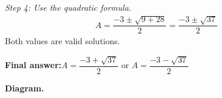\documentclass[11pt]{article}
\begin{document}
\textit{Step 4: Use the quadratic formula.}
\[\begin{gathered}
A = \dfrac{-3 \pm \sqrt{9 + 28}}{2} = \dfrac{-3 \pm \sqrt{37}}{2}
\end{gathered}\]
Both values are valid solutions.

\begin{answerbox}
\textbf{Final answer:}\quad \(\displaystyle A = \dfrac{-3 + \sqrt{37}}{2}\) or \(\displaystyle A = \dfrac{-3 - \sqrt{37}}{2}\)
\end{answerbox}
\textbf{Diagram.}

\begin{center}
\end{center}
\end{document}
